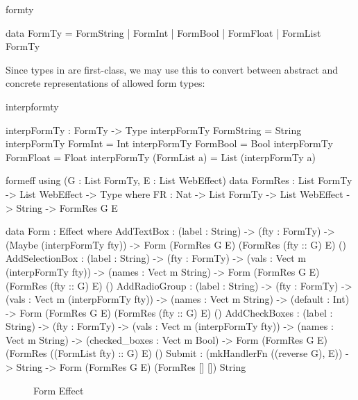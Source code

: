 \begin{SaveVerbatim}{formty}

data FormTy = FormString | FormInt
            | FormBool   | FormFloat
            | FormList FormTy 

\end{SaveVerbatim}

\noindent
Since types in \idris{} are first-class, we may use this to convert
between abstract and concrete representations of allowed form types:

\begin{SaveVerbatim}{interpformty}

interpFormTy : FormTy -> Type
interpFormTy FormString = String
interpFormTy FormInt = Int
interpFormTy FormBool = Bool
interpFormTy FormFloat = Float
interpFormTy (FormList a) = List (interpFormTy a)

\end{SaveVerbatim}

\begin{SaveVerbatim}{formeff}
using (G : List FormTy, E : List WebEffect)
  data FormRes : List FormTy -> List WebEffect -> Type where
    FR : Nat -> List FormTy -> List WebEffect -> String -> FormRes G E
  
  data Form : Effect where
    AddTextBox      : (label : String) -> (fty : FormTy) -> (Maybe (interpFormTy fty)) -> 
                      Form (FormRes G E) (FormRes (fty :: G) E) () 
    AddSelectionBox : (label : String) -> (fty : FormTy) -> (vals : Vect m (interpFormTy fty)) -> 
                      (names : Vect m String) ->
                      Form (FormRes G E)  (FormRes (fty :: G) E) ()
    AddRadioGroup   : (label : String) -> (fty : FormTy) -> (vals : Vect m (interpFormTy fty)) ->
                      (names : Vect m String) -> (default : Int) ->
                      Form (FormRes G E)  (FormRes (fty :: G) E) ()
    AddCheckBoxes   : (label : String) -> (fty : FormTy) -> (vals : Vect m (interpFormTy fty)) ->
                      (names : Vect m String) -> (checked_boxes : Vect m Bool) ->
                      Form (FormRes G E)  (FormRes ((FormList fty) :: G) E) ()
    Submit          : (mkHandlerFn ((reverse G), E)) -> String -> 
                      Form (FormRes G E)  (FormRes [] [])       String
\end{SaveVerbatim}

\begin{figure*}[t]
\begin{center}
\end{center}
\caption{Form Effect}
\label{fig:formeffect}
\end{figure*}

